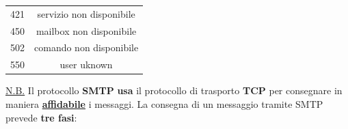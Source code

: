 \documentclass[11pt,a4paper,oneside]{book}
\theoremstyle{definition}
\begin{document}
\begin{itemize}
\begin{table}[h!]
\begin{center}
\begin{tabular}{l|c}
				      421             & servizio non disponibile                 \\
				      450             & mailbox non disponibile                  \\
				      502             & comando non disponibile                  \\
				      550             & user uknown                              \\
			      \end{tabular}
		      \end{center}
	      \end{table}
\end{itemize}

\pagebreak

\underline{N.B.} Il protocollo \textbf{SMTP} \textbf{usa} il protocollo di trasporto \textbf{TCP} per consegnare in maniera \textbf{\underline{affidabile}} i messaggi.\newline\newline
La consegna di un messaggio tramite SMTP prevede \textbf{tre fasi}:
\end{document}
